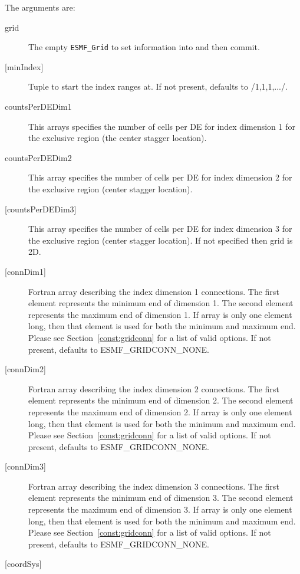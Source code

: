    The arguments are:
   \begin{description}
   \item[grid]
       The empty {\tt ESMF\_Grid} to set information into and then commit.
   \item[{[minIndex]}]
        Tuple to start the index ranges at. If not present, defaults
        to /1,1,1,.../.
   \item[countsPerDEDim1]
       This arrays specifies the number of cells per DE for index dimension 1
       for the exclusive region (the center stagger location).
   \item[countsPerDEDim2]
       This array specifies the number of cells per DE for index dimension 2
       for the exclusive region (center stagger location).
   \item[{[countsPerDEDim3]}]
       This array specifies the number of cells per DE for index dimension 3
       for the exclusive region (center stagger location).
       If not specified  then grid is 2D.
   \item[{[connDim1]}]
        Fortran array describing the index dimension 1 connections.
        The first element represents the minimum end of dimension 1.
        The second element represents the maximum end of dimension 1.
        If array is only one element long, then that element is used
        for both the minimum and maximum end.
        Please see Section~\ref{const:gridconn} for a list of valid
        options. If not present, defaults to ESMF\_GRIDCONN\_NONE.
   \item[{[connDim2]}]
        Fortran array describing the index dimension 2 connections.
        The first element represents the minimum end of dimension 2.
        The second element represents the maximum end of dimension 2.
        If array is only one element long, then that element is used
        for both the minimum and maximum end.
        Please see Section~\ref{const:gridconn} for a list of valid
        options. If not present, defaults to ESMF\_GRIDCONN\_NONE.
   \item[{[connDim3]}]
        Fortran array describing the index dimension 3 connections.
        The first element represents the minimum end of dimension 3.
        The second element represents the maximum end of dimension 3.
        If array is only one element long, then that element is used
        for both the minimum and maximum end.
        Please see Section~\ref{const:gridconn} for a list of valid
        options. If not present, defaults to ESMF\_GRIDCONN\_NONE.
   \item[{[coordSys]}]

\end{description}
